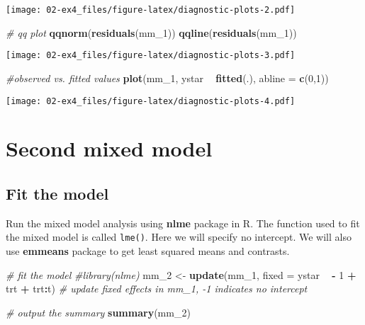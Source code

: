 \documentclass[]{book}
\newenvironment{Shaded}{\begin{snugshade}}{\end{snugshade}}
\newcommand{\CommentTok}[1]{\textcolor[rgb]{0.56,0.35,0.01}{\textit{#1}}}
\newcommand{\DataTypeTok}[1]{\textcolor[rgb]{0.13,0.29,0.53}{#1}}
\newcommand{\DecValTok}[1]{\textcolor[rgb]{0.00,0.00,0.81}{#1}}
\newcommand{\KeywordTok}[1]{\textcolor[rgb]{0.13,0.29,0.53}{\textbf{#1}}}
\newcommand{\NormalTok}[1]{#1}
\newcommand{\OperatorTok}[1]{\textcolor[rgb]{0.81,0.36,0.00}{\textbf{#1}}}
\newcommand{\StringTok}[1]{\textcolor[rgb]{0.31,0.60,0.02}{#1}}
\begin{document}
\texttt{[image: 02-ex4\_files/figure-latex/diagnostic-plots-2.pdf]}

\begin{Shaded}
\begin{Highlighting}[]
\CommentTok{# qq plot}
\KeywordTok{qqnorm}\NormalTok{(}\KeywordTok{residuals}\NormalTok{(mm_}\DecValTok{1}\NormalTok{))}
\KeywordTok{qqline}\NormalTok{(}\KeywordTok{residuals}\NormalTok{(mm_}\DecValTok{1}\NormalTok{))}
\end{Highlighting}
\end{Shaded}

\texttt{[image: 02-ex4\_files/figure-latex/diagnostic-plots-3.pdf]}

\begin{Shaded}
\begin{Highlighting}[]
\CommentTok{#observed vs. fitted values}
\KeywordTok{plot}\NormalTok{(mm_}\DecValTok{1}\NormalTok{, ystar }\OperatorTok{~}\StringTok{ }\KeywordTok{fitted}\NormalTok{(.), }\DataTypeTok{abline =} \KeywordTok{c}\NormalTok{(}\DecValTok{0}\NormalTok{,}\DecValTok{1}\NormalTok{))}
\end{Highlighting}
\end{Shaded}

\texttt{[image: 02-ex4\_files/figure-latex/diagnostic-plots-4.pdf]}

\hypertarget{second-mixed-model}{%
\section{Second mixed model}\label{second-mixed-model}}

\hypertarget{fit-the-model-1}{%
\subsection{Fit the model}\label{fit-the-model-1}}

Run the mixed model analysis using \textbf{nlme} package in R. The function used to fit the mixed model is called \texttt{lme()}. Here we will specify no intercept. We will also use \textbf{emmeans} package to get least squared means and contrasts.

\begin{Shaded}
\begin{Highlighting}[]
\CommentTok{# fit the model}
\CommentTok{#library(nlme)}
\NormalTok{mm_}\DecValTok{2}\NormalTok{ <-}\StringTok{ }\KeywordTok{update}\NormalTok{(mm_}\DecValTok{1}\NormalTok{, }\DataTypeTok{fixed =}\NormalTok{ ystar }\OperatorTok{~}\StringTok{ }\OperatorTok{-}\StringTok{ }\DecValTok{1} \OperatorTok{+}\StringTok{ }\NormalTok{trt }\OperatorTok{+}\StringTok{ }\NormalTok{trt}\OperatorTok{:}\NormalTok{t) }\CommentTok{# update fixed effects in mm_1, -1 indicates no intercept}

\CommentTok{# output the summary}
\KeywordTok{summary}\NormalTok{(mm_}\DecValTok{2}\NormalTok{)}
\end{Highlighting}
\end{Shaded}
\end{document}
